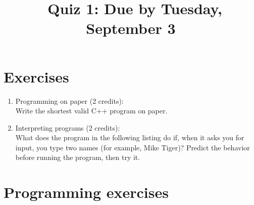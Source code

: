 \documentclass[11pt]{article}
\begin{document}
\title{\coursename~Quiz 1: Due by Tuesday, September 3}
\date{}
\maketitle

\medskip


\section*{Exercises}

\begin{enumerate}
\item Programming on paper (2 credits): \\
Write the shortest valid C++ program on paper.

\item Interpreting programs (2 credits): \\
What does the program in the following listing do if, when it asks you for input, you type two names (for example, Mike Tiger)? Predict the behavior before running the program, then try it.



\end{enumerate}

\section*{Programming exercises}
\end{document}
